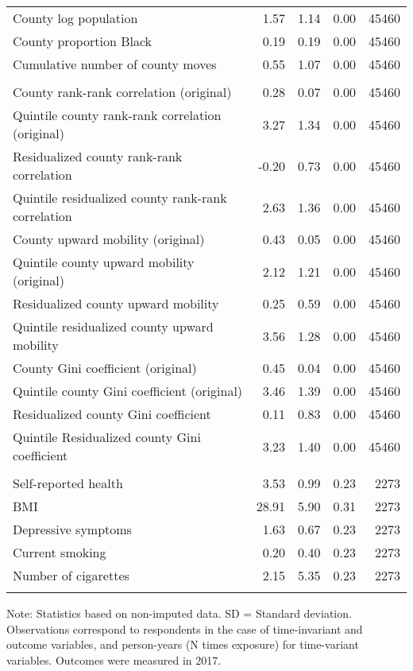 \begin{table}[htp]
\begin{threeparttable}
\begin{tabular}{lrrrr}
  County log population & 1.57 & 1.14 & 0.00 & 45460 \\ 
  County proportion Black & 0.19 & 0.19 & 0.00 & 45460 \\ 
  Cumulative number of county moves & 0.55 & 1.07 & 0.00 & 45460 \\ 
   \addlinespace
\multicolumn{5}{l}{\textbf{\textit{Exposure variables}}} \\
\addlinespace
County rank-rank correlation (original) & 0.28 & 0.07 & 0.00 & 45460 \\ 
  Quintile county rank-rank correlation (original) & 3.27 & 1.34 & 0.00 & 45460 \\ 
  Residualized county rank-rank correlation & -0.20 & 0.73 & 0.00 & 45460 \\ 
  Quintile residualized county rank-rank correlation & 2.63 & 1.36 & 0.00 & 45460 \\ 
  County upward mobility (original) & 0.43 & 0.05 & 0.00 & 45460 \\ 
  Quintile county upward mobility (original) & 2.12 & 1.21 & 0.00 & 45460 \\ 
  Residualized county upward mobility & 0.25 & 0.59 & 0.00 & 45460 \\ 
  Quintile residualized county upward mobility & 3.56 & 1.28 & 0.00 & 45460 \\ 
  County Gini coefficient (original) & 0.45 & 0.04 & 0.00 & 45460 \\ 
  Quintile county Gini coefficient (original) & 3.46 & 1.39 & 0.00 & 45460 \\ 
  Residualized county Gini coefficient & 0.11 & 0.83 & 0.00 & 45460 \\ 
  Quintile Residualized county Gini coefficient & 3.23 & 1.40 & 0.00 & 45460 \\ 
   \addlinespace
\multicolumn{5}{l}{\textbf{\textit{Outcomes}}} \\
\addlinespace
Self-reported health & 3.53 & 0.99 & 0.23 & 2273 \\ 
  BMI & 28.91 & 5.90 & 0.31 & 2273 \\ 
  Depressive symptoms & 1.63 & 0.67 & 0.23 & 2273 \\ 
  Current smoking & 0.20 & 0.40 & 0.23 & 2273 \\ 
  Number of cigarettes & 2.15 & 5.35 & 0.23 & 2273 \\ 
   \addlinespace
\hline
\addlinespace
\end{tabular}
\endgroup
\begin{tablenotes}
\scriptsize
\item Note: Statistics based on non-imputed data. SD = Standard deviation. Observations correspond to respondents in the case of time-invariant and outcome variables, and person-years (N times exposure) for time-variant variables. Outcomes were measured in 2017.
\end{tablenotes}
\end{threeparttable}
\end{table}
